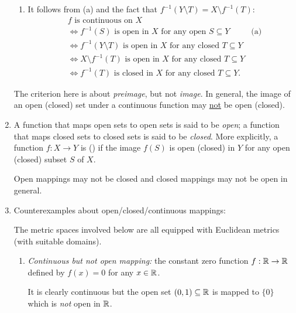 \begin{enumerate}
\begin{pf}
\begin{enumerate}
\item It follows from (a) and the fact that \(f^{-1}(Y\setminus T)=X\setminus
f^{-1}(T)\):
\begin{align*}
&\text{\(f\) is continuous on \(X\)}\\
&\iff \text{\(f^{-1}(S)\) is open in \(X\) for any open \(S\subseteq Y\)}&\text{(a)}\\
&\iff \text{\(f^{-1}(Y\setminus T)\) is open in \(X\) for any closed \(T\subseteq Y\)}\\
&\iff \text{\(X\setminus f^{-1}(T)\) is open in \(X\) for any closed \(T\subseteq Y\)}\\
&\iff \text{\(f^{-1}(T)\) is closed in \(X\) for any closed \(T\subseteq Y\)}.
\end{align*}
\end{enumerate}
\end{pf}

\begin{warning}
The criterion here is about \emph{preimage}, but not \emph{image}. In general,
the image of an open (closed) set under a continuous function may
\underline{not} be open (closed).
\end{warning}

\item A function that maps open sets to open sets is said to be \emph{open}; a
function that maps closed sets to closed sets is said to be \emph{closed}. More
explicitly, a function \(f:X\to Y\) is  () if the image
\(f(S)\) is open (closed) in \(Y\) for any open (closed) subset \(S\) of \(X\).

Open mappings may not be closed and closed mappings may not be open in general.

\item Counterexamples about open/closed/continuous mappings:
\begin{note}
The metric spaces involved below are all equipped with Euclidean metrics (with
suitable domains).
\end{note}
\begin{enumerate}
\item \emph{Continuous but not open mapping:} the constant zero function
\(f:\mathbb{R}\to\mathbb{R}\) defined by \(f(x)=0\) for any \(x\in\mathbb{R}\).

\begin{pf}
It is clearly continuous but the open set \((0,1)\subseteq\mathbb{R}\) is mapped to
\(\{0\}\) which is \emph{not} open in \(\mathbb{R}\).
\end{pf}


\end{enumerate}
\end{enumerate}
